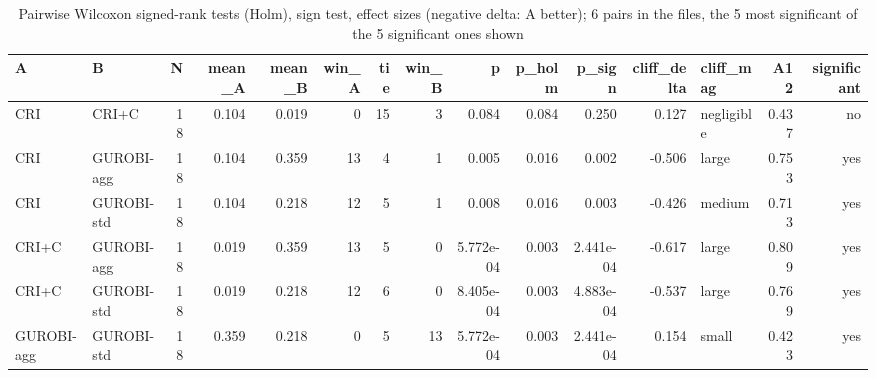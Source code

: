 \begin{table}[htbp]
\centering
\small
\caption{Pairwise Wilcoxon signed-rank tests (Holm), sign test, effect sizes (negative delta: A better); 6 pairs in the files, the 5 most significant of the 5 significant ones shown}
\label{tab:E3_long_runs_b600_pairwise}
\begin{tabular}{llrrrrrrrrrrlrr}
\toprule
A & B & N & mean\_A & mean\_B & win\_A & tie & win\_B & p & p\_holm & p\_sign & cliff\_delta & cliff\_mag & A12 & significant \\
\midrule
CRI & CRI+C & 18 & 0.104 & 0.019 & 0 & 15 & 3 & 0.084 & 0.084 & 0.250 & 0.127 & negligible & 0.437 & no \\
CRI & GUROBI-agg & 18 & 0.104 & 0.359 & 13 & 4 & 1 & 0.005 & 0.016 & 0.002 & -0.506 & large & 0.753 & yes \\
CRI & GUROBI-std & 18 & 0.104 & 0.218 & 12 & 5 & 1 & 0.008 & 0.016 & 0.003 & -0.426 & medium & 0.713 & yes \\
CRI+C & GUROBI-agg & 18 & 0.019 & 0.359 & 13 & 5 & 0 & 5.772e-04 & 0.003 & 2.441e-04 & -0.617 & large & 0.809 & yes \\
CRI+C & GUROBI-std & 18 & 0.019 & 0.218 & 12 & 6 & 0 & 8.405e-04 & 0.003 & 4.883e-04 & -0.537 & large & 0.769 & yes \\
GUROBI-agg & GUROBI-std & 18 & 0.359 & 0.218 & 0 & 5 & 13 & 5.772e-04 & 0.003 & 2.441e-04 & 0.154 & small & 0.423 & yes \\
\bottomrule
\end{tabular}
\end{table}
